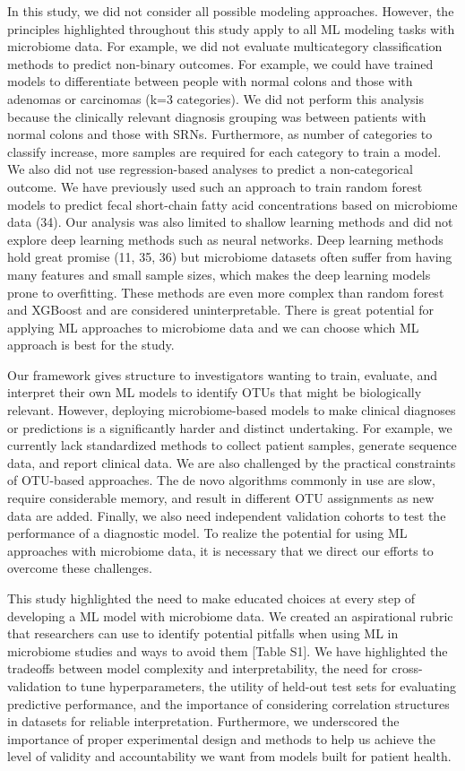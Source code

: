 \documentclass[11pt,]{article}
\begin{document}
In this study, we did not consider all possible modeling approaches.
However, the principles highlighted throughout this study apply to all
ML modeling tasks with microbiome data. For example, we did not evaluate
multicategory classification methods to predict non-binary outcomes. For
example, we could have trained models to differentiate between people
with normal colons and those with adenomas or carcinomas (k=3
categories). We did not perform this analysis because the clinically
relevant diagnosis grouping was between patients with normal colons and
those with SRNs. Furthermore, as number of categories to classify
increase, more samples are required for each category to train a model.
We also did not use regression-based analyses to predict a
non-categorical outcome. We have previously used such an approach to
train random forest models to predict fecal short-chain fatty acid
concentrations based on microbiome data (34). Our analysis was also
limited to shallow learning methods and did not explore deep learning
methods such as neural networks. Deep learning methods hold great
promise (11, 35, 36) but microbiome datasets often suffer from having
many features and small sample sizes, which makes the deep learning
models prone to overfitting. These methods are even more complex than
random forest and XGBoost and are considered uninterpretable. There is
great potential for applying ML approaches to microbiome data and we can
choose which ML approach is best for the study.

Our framework gives structure to investigators wanting to train,
evaluate, and interpret their own ML models to identify OTUs that might
be biologically relevant. However, deploying microbiome-based models to
make clinical diagnoses or predictions is a significantly harder and
distinct undertaking. For example, we currently lack standardized
methods to collect patient samples, generate sequence data, and report
clinical data. We are also challenged by the practical constraints of
OTU-based approaches. The de novo algorithms commonly in use are slow,
require considerable memory, and result in different OTU assignments as
new data are added. Finally, we also need independent validation cohorts
to test the performance of a diagnostic model. To realize the potential
for using ML approaches with microbiome data, it is necessary that we
direct our efforts to overcome these challenges.

This study highlighted the need to make educated choices at every step
of developing a ML model with microbiome data. We created an
aspirational rubric that researchers can use to identify potential
pitfalls when using ML in microbiome studies and ways to avoid them
{[}Table S1{]}. We have highlighted the tradeoffs between model
complexity and interpretability, the need for cross-validation to tune
hyperparameters, the utility of held-out test sets for evaluating
predictive performance, and the importance of considering correlation
structures in datasets for reliable interpretation. Furthermore, we
underscored the importance of proper experimental design and methods to
help us achieve the level of validity and accountability we want from
models built for patient health.
\end{document}
